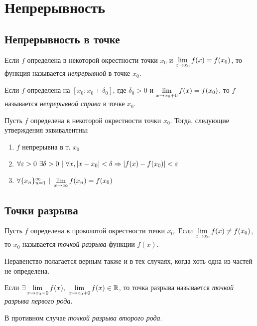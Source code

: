 \section{Непрерывность}

\subsection{Непрерывность в точке}

\begin{definition}
	Если $f$ определена в некоторой окрестности точки $x_0$ и $\lim\limits_{x \to x_0} f(x) = f(x_0)$, то функция называется \textit{непрерывной} в точке $x_0$.
\end{definition}

\begin{definition}
	Если $f$ определена на $[x_0; x_0 + \delta_0]$, где $\delta_0 > 0$ и $\lim\limits_{x \to x_0 + 0} f(x) = f(x_0)$, то $f$ называется \textit{непрерывной справа} в точке $x_0$.
\end{definition}

\begin{theorem}
	Пусть $f$ определена в некоторой окрестности точки $x_0$. Тогда, следующие утверждения эквивалентны:
	\begin{enumerate}
		\item $f$ непрерывна в т. $x_0$
		\item $\forall \varepsilon > 0\ \exists \delta > 0\ |\ \forall x, |x - x_0| < \delta \Rightarrow |f(x) - f(x_0)| < \varepsilon$
		\item $\forall \{x_n\}_{n = 1}^\infty\ |\ \liml_{x \to \infty} f(x_n) = f(x_0)$
	\end{enumerate}
\end{theorem}

\subsection{Точки разрыва}

\begin{definition}
	Пусть $f$ определена в проколотой окрестности точки $x_0$. Если $\lim\limits_{x \to x_0} f(x) \neq f(x_0)$, то $x_0$ называется \textit{точкой разрыва} функции $f(x)$.
\end{definition}

\begin{note}
	Неравенство полагается верным также и в тех случаях, когда хоть одна из частей не определена.
\end{note}

\begin{definition}
	Если $\exists \liml_{x \to x_0-0} f(x),\ \liml_{x \to x_0+0} f(x) \in \R$, то точка разрыва называется \textit{точкой разрыва первого рода}.
	
	В противном случае \textit{точкой разрыва второго рода}.
\end{definition}

